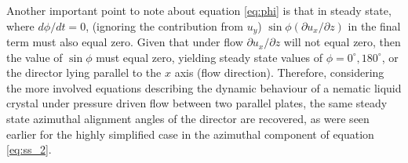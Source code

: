 Another important point to note about equation \ref{eq:phi} is that in steady state, where $d\phi/dt=0$, (ignoring the contribution from $u_y$) $\sin\phi\left(\partial u_x/\partial z\right)$ in the final term must also equal zero. Given that under flow $\partial u_x/\partial z$ will not equal zero, then the value of $\sin\phi$ must equal zero, yielding steady state values of $\phi=0^{\circ},180^{\circ}$, or the director lying parallel to the $x$ axis (flow direction). Therefore, considering the more involved equations describing the dynamic behaviour of a nematic liquid crystal under pressure driven flow between two parallel plates, the same steady state azimuthal alignment angles of the director are recovered, as were seen earlier for the highly simplified case in the azimuthal component of equation \ref{eq:ss_2}.








